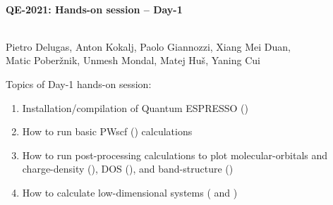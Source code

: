 \documentclass[landscape]{foils}
\begin{document}

\blue
~\\
\vspace*{4cm}
\MyLogo{~}
\vspace{5em}
\begin{center}
  \centerline{\red\LARGE\bf QE-2021: Hands-on session -- Day-1}
  ~\\[1.5em]  
  \large Pietro Delugas, Anton Kokalj, Paolo Giannozzi, Xiang
  Mei Duan,\\
  Matic Pober\v{z}nik, Unmesh Mondal, Matej Hu\v{s}, Yaning Cui
\end{center}

Topics of Day-1 hands-on session:
\begin{enumerate}
\item Installation/compilation of Quantum ESPRESSO ()
\item How to run basic PWscf () calculations
\item How to run post-processing calculations to plot
  molecular-orbitals and charge-density (), DOS
  (), and band-structure ()
\item How to calculate low-dimensional systems ( and
  )
\end{enumerate}
    
\end{document}
